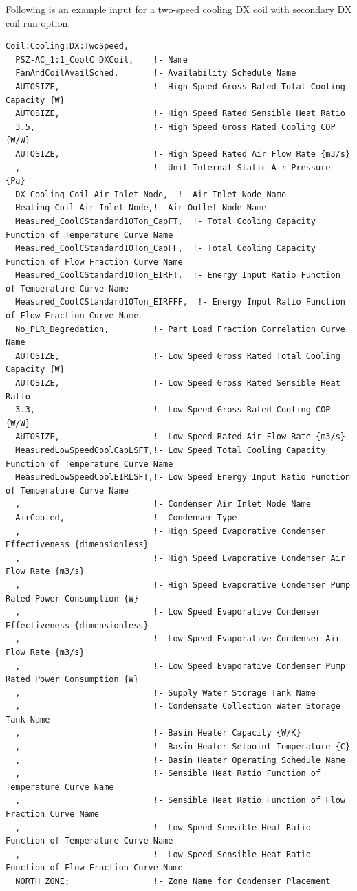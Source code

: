 Following is an example input for a two-speed cooling DX coil with secondary DX coil run option.

\begin{lstlisting}
Coil:Cooling:DX:TwoSpeed,
  PSZ-AC_1:1_CoolC DXCoil,    !- Name
  FanAndCoilAvailSched,       !- Availability Schedule Name
  AUTOSIZE,                   !- High Speed Gross Rated Total Cooling Capacity {W}
  AUTOSIZE,                   !- High Speed Rated Sensible Heat Ratio
  3.5,                        !- High Speed Gross Rated Cooling COP {W/W}
  AUTOSIZE,                   !- High Speed Rated Air Flow Rate {m3/s}
  ,                           !- Unit Internal Static Air Pressure {Pa}
  DX Cooling Coil Air Inlet Node,  !- Air Inlet Node Name
  Heating Coil Air Inlet Node,!- Air Outlet Node Name
  Measured_CoolCStandard10Ton_CapFT,  !- Total Cooling Capacity Function of Temperature Curve Name
  Measured_CoolCStandard10Ton_CapFF,  !- Total Cooling Capacity Function of Flow Fraction Curve Name
  Measured_CoolCStandard10Ton_EIRFT,  !- Energy Input Ratio Function of Temperature Curve Name
  Measured_CoolCStandard10Ton_EIRFFF,  !- Energy Input Ratio Function of Flow Fraction Curve Name
  No_PLR_Degredation,         !- Part Load Fraction Correlation Curve Name
  AUTOSIZE,                   !- Low Speed Gross Rated Total Cooling Capacity {W}
  AUTOSIZE,                   !- Low Speed Gross Rated Sensible Heat Ratio
  3.3,                        !- Low Speed Gross Rated Cooling COP {W/W}
  AUTOSIZE,                   !- Low Speed Rated Air Flow Rate {m3/s}
  MeasuredLowSpeedCoolCapLSFT,!- Low Speed Total Cooling Capacity Function of Temperature Curve Name
  MeasuredLowSpeedCoolEIRLSFT,!- Low Speed Energy Input Ratio Function of Temperature Curve Name
  ,                           !- Condenser Air Inlet Node Name
  AirCooled,                  !- Condenser Type
  ,                           !- High Speed Evaporative Condenser Effectiveness {dimensionless}
  ,                           !- High Speed Evaporative Condenser Air Flow Rate {m3/s}
  ,                           !- High Speed Evaporative Condenser Pump Rated Power Consumption {W}
  ,                           !- Low Speed Evaporative Condenser Effectiveness {dimensionless}
  ,                           !- Low Speed Evaporative Condenser Air Flow Rate {m3/s}
  ,                           !- Low Speed Evaporative Condenser Pump Rated Power Consumption {W}
  ,                           !- Supply Water Storage Tank Name
  ,                           !- Condensate Collection Water Storage Tank Name
  ,                           !- Basin Heater Capacity {W/K}
  ,                           !- Basin Heater Setpoint Temperature {C}
  ,                           !- Basin Heater Operating Schedule Name
  ,                           !- Sensible Heat Ratio Function of Temperature Curve Name
  ,                           !- Sensible Heat Ratio Function of Flow Fraction Curve Name
  ,                           !- Low Speed Sensible Heat Ratio Function of Temperature Curve Name
  ,                           !- Low Speed Sensible Heat Ratio Function of Flow Fraction Curve Name
  NORTH ZONE;                 !- Zone Name for Condenser Placement
\end{lstlisting}

